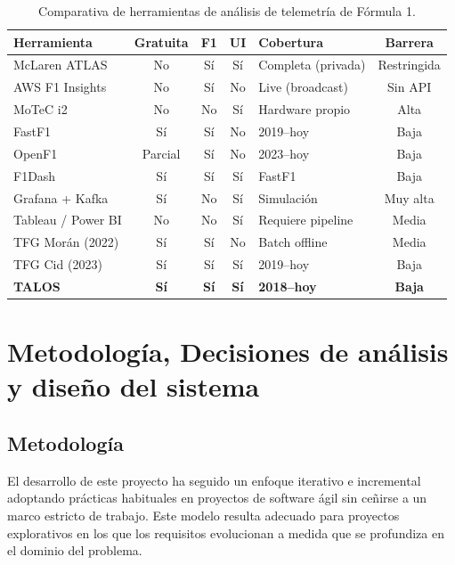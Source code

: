 \documentclass[12pt,a4paper,twoside,openright]{book}
\begin{document}
\begin{table}[ht]
  \centering
  \caption{Comparativa de herramientas de análisis de telemetría de Fórmula 1.}
  \label{tab:comparativa}
  \small
  \begin{tabularx}{\textwidth}{l c c c X c}
    \toprule
    \textbf{Herramienta} & \textbf{Gratuita} & \textbf{F1} & \textbf{UI} & \textbf{Cobertura} & \textbf{Barrera} \\
    \midrule
    McLaren ATLAS      & No  & Sí & Sí & Completa (privada) & Restringida \\
    AWS F1 Insights    & No  & Sí & No & Live (broadcast)   & Sin API \\
    MoTeC i2           & No  & No & Sí & Hardware propio    & Alta \\
    FastF1             & Sí  & Sí & No & 2019--hoy          & Baja \\
    OpenF1             & Parcial & Sí & No & 2023--hoy      & Baja \\
    F1Dash             & Sí  & Sí & Sí & FastF1             & Baja \\
    Grafana + Kafka    & Sí  & No & Sí & Simulación         & Muy alta \\
    Tableau / Power BI & No  & No & Sí & Requiere pipeline  & Media \\
    TFG Morán (2022)   & Sí  & Sí & No & Batch offline      & Media \\
    TFG Cid (2023)     & Sí  & Sí & Sí & 2019--hoy          & Baja \\
    \midrule
    \textbf{TALOS}     & \textbf{Sí} & \textbf{Sí} & \textbf{Sí} & \textbf{2018--hoy} & \textbf{Baja} \\
    \bottomrule
  \end{tabularx}
\end{table}

\chapter{Metodología, Decisiones de análisis y diseño del sistema}

\section{Metodología}
\noindent El desarrollo de este proyecto ha seguido un enfoque iterativo e incremental adoptando prácticas habituales en proyectos de software ágil sin ceñirse a un marco estricto de trabajo.
Este modelo resulta adecuado para proyectos explorativos en los que los requisitos evolucionan a medida que se profundiza en el dominio del problema.
\end{document}
